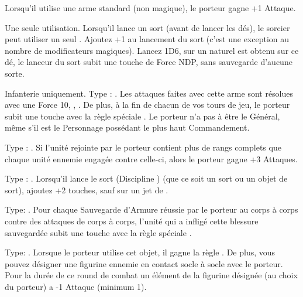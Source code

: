 \listitemonecol{\tailweapon} Lorsqu'il utilise une arme standard (non magique), le porteur gagne +1 Attaque.

\listitemonecol{\darkshard} Une seule utilisation. Lorsqu'il lance un sort (avant de lancer les dés), le sorcier peut utiliser un seul \darkshard. Ajoutez +1 au lancement du sort (c'est une exception au nombre de modificateurs magiques). Lancez 1D6, sur un  naturel est obtenu sur ce dé, le lanceur du sort subit une touche de Force NDP, sans sauvegarde d'aucune sorte.

\enditemlistonecol

\closearmyarmoury

\startarmymagicalitems

\armymagicalweapons

\startpricelist

Infanterie uniquement. Type : \hw{}. Les attaques faites avec cette arme sont résolues avec une Force 10, \divineattacks{}, . De plus, à la fin de chacun de vos tours de jeu, le porteur subit une touche avec la règle spéciale \toxicattacks{}. Le porteur n'a pas à être le Général, même s'il est le Personnage possédant le plus haut Commandement.

Type : \hw{}. Si l'unité rejointe par le porteur contient plus de rangs complets que chaque unité ennemie engagée contre celle-ci, alors le porteur gagne +3 Attaques.

Type : \halberd{}. Lorsqu'il lance le sort \ruinsignature (Discipline \ruin{}) (que ce soit un sort ou un objet de sort), ajoutez +2 touches, sauf sur un jet de .

\endpricelist

\armymagicalarmour

\startpricelist

Type: \pa{}. Pour chaque Sauvegarde d'Armure réussie par le porteur au corps à corps contre des attaques de corps à corps, l'unité qui a infligé cette blessure sauvegardée subit une touche avec la règle spéciale \toxicattacks{}.

Type: \shield{}. Lorsque le porteur utilise cet objet, il gagne la règle \distracting{}. De plus, vous pouvez désigner une figurine ennemie en contact socle à socle avec le porteur. Pour la durée de ce round de combat un élément de la figurine désignée (au choix du porteur) a -1 Attaque (minimum 1).

